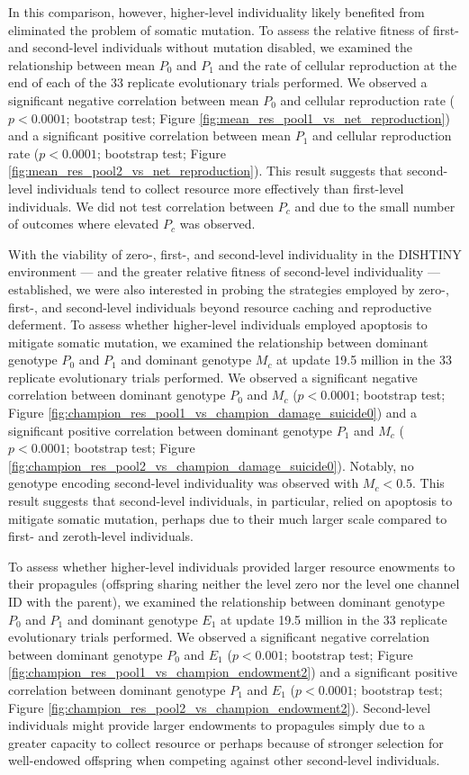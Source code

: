 In this comparison, however, higher-level individuality likely benefited from eliminated the problem of somatic mutation.
To assess the relative fitness of first- and second-level individuals without mutation disabled, we examined the relationship between mean $P_0$ and $P_1$ and the rate of cellular reproduction at the end of each of the 33 replicate evolutionary trials performed.
We observed a significant negative correlation between mean $P_0$ and cellular reproduction rate ($p < 0.0001$; bootstrap test; Figure \ref{fig:mean_res_pool1_vs_net_reproduction}) and a significant positive correlation between mean $P_1$ and cellular reproduction rate ($p < 0.0001$; bootstrap test; Figure \ref{fig:mean_res_pool2_vs_net_reproduction}).
This result suggests that second-level individuals tend to collect resource more effectively than first-level individuals.
We did not test correlation between $P_{c}$ and due to the small number of outcomes where elevated $P_{c}$ was observed.

With the viability of zero-, first-, and second-level individuality in the DISHTINY environment --- and the greater relative fitness of second-level individuality --- established, we were also interested in probing the strategies employed by zero-, first-, and second-level individuals beyond resource caching and reproductive deferment.
To assess whether higher-level individuals employed apoptosis to mitigate somatic mutation, we examined the relationship between dominant genotype $P_0$ and $P_1$ and dominant genotype $M_{c}$ at update 19.5 million in the 33 replicate evolutionary trials performed.
We observed a significant negative correlation between dominant genotype $P_0$ and $M_{c}$ ($p < 0.0001$; bootstrap test; Figure \ref{fig:champion_res_pool1_vs_champion_damage_suicide0}) and a significant positive correlation between dominant genotype $P_1$ and $M_{c}$ ($p < 0.0001$; bootstrap test; Figure \ref{fig:champion_res_pool2_vs_champion_damage_suicide0}).
Notably, no genotype encoding second-level individuality was observed with $M_{c} < 0.5$.
This result suggests that second-level individuals, in particular, relied on apoptosis to mitigate somatic mutation, perhaps due to their much larger scale compared to first- and zeroth-level individuals.

To assess whether higher-level individuals provided larger resource enowments to their propagules (offspring sharing neither the level zero nor the level one channel ID with the parent), we examined the relationship between dominant genotype $P_0$ and $P_1$ and dominant genotype $E_1$ at update 19.5 million in the 33 replicate evolutionary trials performed.
We observed a significant negative correlation between dominant genotype $P_0$ and $E_1$ ($p < 0.001$; bootstrap test; Figure \ref{fig:champion_res_pool1_vs_champion_endowment2}) and a significant positive correlation between dominant genotype $P_1$ and $E_1$ ($p <  0.0001$; bootstrap test; Figure \ref{fig:champion_res_pool2_vs_champion_endowment2}).
Second-level individuals might provide larger endowments to propagules simply due to a greater capacity to collect resource or perhaps because of stronger selection for well-endowed offspring when competing against other second-level individuals.

